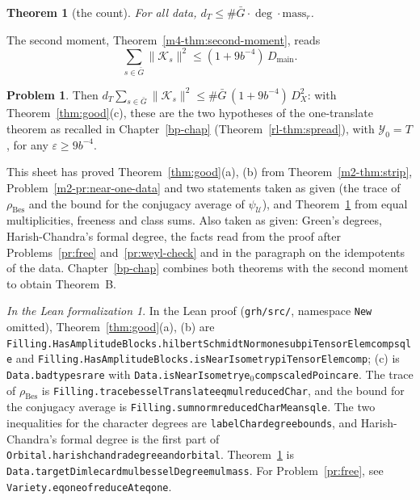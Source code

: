 \documentclass[reqno]{amsart}
\newcounter{chap}
\theoremstyle{plain}
\newtheorem{theorem}{Theorem}[section]
\theoremstyle{definition}
\newtheorem{problem}{Problem}[section]
\theoremstyle{remark}
\newtheorem*{leanremark}{In the Lean formalization}
\newcommand{\Gb}{\bar G}
\newcommand{\Kc}{\mathcal K}
\newcommand{\Uc}{\mathcal U}
\newcommand{\rB}{\rho_{\mathrm{Bes}}}
\newcommand{\Dmain}{D_{\mathrm{main}}}
\newcommand{\mass}{\mathrm{mass}_r}
\newcommand{\tlus}{\textunderscore\allowbreak}
\newcommand{\tl}[1]{{\let\_\tlus\texttt{#1}}}
\begin{document}
\begin{theorem}[the count]\label{thm:count}
For all data, \(d_T \le \#\Gb\cdot\deg\cdot\mass\).
\end{theorem}

The second moment, Theorem~\ref{m4-thm:second-moment}, reads
\[
 \sum_{s \in \Gb}\lVert\Kc_s\rVert^2 \le (1 + 9b^{-4})\,\Dmain .
\]

\begin{problem}\label{pr:spread-hyp}
Then \(d_T\sum_{s \in \Gb}\lVert\Kc_s\rVert^2 \le \#\Gb\,(1 + 9b^{-4})\,D_X^2\): with Theorem~\ref{thm:good}(c), these are the two hypotheses of the one-translate theorem as recalled in Chapter~\ref{bp-chap} (Theorem~\ref{rl-thm:spread}), with \(\mathcal Y_0=T\), for any \(\varepsilon\ge9b^{-4}\).
\end{problem}

This sheet has proved Theorem~\ref{thm:good}(a), (b) from Theorem~\ref{m2-thm:strip}, Problem~\ref{m2-pr:near-one-data} and two statements taken as given (the trace of \(\rB\) and the bound for the conjugacy average of \(\psi_{\Uc}\)), and Theorem~\ref{thm:count} from equal multiplicities, freeness and class sums.  Also taken as given: Green's degrees, Harish-Chandra's formal degree, the facts read from the proof after Problems~\ref{pr:free} and~\ref{pr:weyl-check} and in the paragraph on the idempotents of the data.  Chapter~\ref{bp-chap} combines both theorems with the second moment to obtain Theorem~B.

\begin{leanremark}
\begin{sloppypar}\raggedright
In the Lean proof \cite{GL} (\tl{grh/src/}, namespace \tl{New} omitted), Theorem~\ref{thm:good}(a), (b) are \tl{Filling.HasAmplitudeBlocks.hilbertSchmidtNorm\_one\_sub\_piTensorElem\_comp\_sq\_le} and \tl{Filling.HasAmplitudeBlocks.isNearIsometry\_piTensorElem\_comp}; (c) is \tl{Data.bad\_types\_rare} with \tl{Data.isNearIsometry\_e\(_0\)\_comp\_scaledPoincare}.  The trace of \(\rB\) is \tl{Filling.trace\_besselTranslate\_eq\_mul\_reducedChar}, and the bound for the conjugacy average is \tl{Filling.sum\_norm\_reducedCharMean\_sq\_le}.  The two inequalities for the character degrees are \tl{labelChar\_degree\_bounds}, and Harish-Chandra's formal degree is the first part of \tl{Orbital.harish\_chandra\_degree\_and\_orbital}.  Theorem~\ref{thm:count} is \tl{Data.targetDim\_le\_card\_mul\_besselDegree\_mul\_mass}.  For Problem~\ref{pr:free}, see \tl{Variety.eq\_one\_of\_reduceAt\_eq\_one}.
\end{sloppypar}
\end{leanremark}
\end{document}
